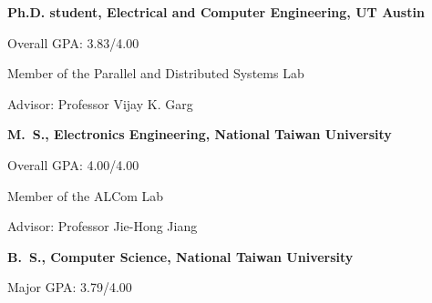 

\begin{myexp}
\item \textbf{Ph.D. student, Electrical and Computer Engineering, UT Austin}   
   \begin{myexp}
   \item Overall GPA: 3.83/4.00  
   \item Member of the Parallel and Distributed Systems Lab
   \item Advisor: Professor Vijay K. Garg
   \end{myexp}
\item \textbf{M.~S., Electronics Engineering, National Taiwan University}  
   \begin{myexp}
   \item Overall GPA: 4.00/4.00
   \item Member of the ALCom Lab
   \item Advisor: Professor  Jie-Hong Jiang

   \end{myexp}
\item \textbf{B.~S., Computer Science, National Taiwan University}  
   \begin{myexp}
   \item Major GPA: 3.79/4.00 
   \end{myexp}
\end{myexp}
